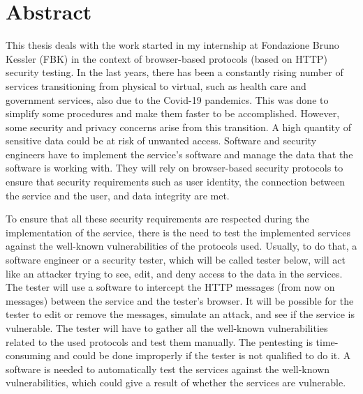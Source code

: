 \chapter*{Abstract} %

This thesis deals with the work started in my internship at Fondazione Bruno Kessler (FBK) in the context of browser-based protocols (based on HTTP) security testing.
In the last years, there has been a constantly rising number of services transitioning from physical to virtual, such as health care and government services, also due to the Covid-19 pandemics. This was done to simplify some procedures and make them faster to be accomplished. However, some security and privacy concerns arise from this transition. A high quantity of sensitive data could be at risk of unwanted access. Software and security engineers have to implement the service's software and manage the data that the software is working with. They will rely on browser-based security protocols to ensure that security requirements such as user identity, the connection between the service and the user, and data integrity are met. 

To ensure that all these security requirements are respected during the implementation of the service, there is the need to test the implemented services against the well-known vulnerabilities of the protocols used. Usually, to do that, a software engineer or a security tester, which will be called tester below, will act like an attacker trying to see, edit, and deny access to the data in the services. The tester will use a software to intercept the HTTP messages (from now on messages) between the service and the tester's browser. It will be possible for the tester to edit or remove the messages, simulate an attack, and see if the service is vulnerable. The tester will have to gather all the well-known vulnerabilities related to the used protocols and test them manually. The pentesting is time-consuming and could be done improperly if the tester is not qualified to do it. A software is needed to automatically test the services against the well-known vulnerabilities, which could give a result of whether the services are vulnerable.

